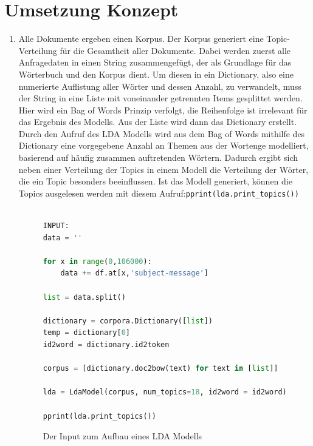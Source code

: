\documentclass[german,version-2020-11]{uzl-thesis}
\begin{document}
\section{Umsetzung Konzept}

\begin{enumerate}
\item
Alle Dokumente ergeben einen Korpus. Der Korpus generiert eine Topic-Verteilung für die Gesamtheit aller Dokumente. Dabei werden zuerst alle Anfragedaten in einen String zusammengefügt, der als Grundlage für das Wörterbuch und den Korpus dient. Um diesen in ein Dictionary, also eine numerierte Auflistung aller Wörter und dessen Anzahl, zu verwandelt, muss der String in eine Liste mit voneinander getrennten Items gesplittet werden. Hier wird ein Bag of Words Prinzip verfolgt, die Reihenfolge ist irrelevant für das Ergebnis des Modells. Aus der Liste wird dann das Dictionary erstellt. Durch den Aufruf des LDA Modells wird aus dem Bag of Words mithilfe des Dictionary eine vorgegebene Anzahl an Themen aus der Wortenge modelliert, basierend auf häufig zusammen auftretenden Wörtern. Dadurch ergibt sich neben einer Verteilung der Topics in einem Modell die Verteilung der Wörter, die ein Topic besonders beeinflussen. Ist das Modell generiert, können die Topics ausgelesen werden mit diesem Aufruf:\lstinline{pprint(lda.print_topics())}\\
\\

\begin{figure}[H]
\begin{lstlisting}[language=Python, basicstyle=\small]
INPUT:
data = ''

for x in range(0,106000):
    data += df.at[x,'subject-message']

list = data.split()

dictionary = corpora.Dictionary([list])
temp = dictionary[0]
id2word = dictionary.id2token

corpus = [dictionary.doc2bow(text) for text in [list]]

lda = LdaModel(corpus, num_topics=18, id2word = id2word)

pprint(lda.print_topics())

\end{lstlisting}
\caption{Der Input zum Aufbau eines LDA Modells}
\end{figure}


\end{enumerate}
\end{document}
